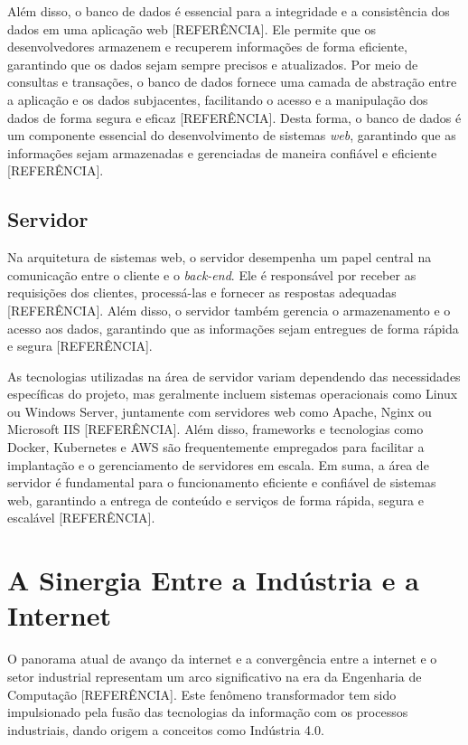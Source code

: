 Além disso, o banco de dados é essencial para a integridade e a consistência dos dados em uma aplicação web [REFERÊNCIA]. Ele permite que os desenvolvedores armazenem e recuperem informações de forma eficiente, garantindo que os dados sejam sempre precisos e atualizados. Por meio de consultas e transações, o banco de dados fornece uma camada de abstração entre a aplicação e os dados subjacentes, facilitando o acesso e a manipulação dos dados de forma segura e eficaz [REFERÊNCIA]. Desta forma, o banco de dados é um componente essencial do desenvolvimento de sistemas \textit{web}, garantindo que as informações sejam armazenadas e gerenciadas de maneira confiável e eficiente [REFERÊNCIA].

\subsection{Servidor}

Na arquitetura de sistemas web, o servidor desempenha um papel central na comunicação entre o cliente e o \textit{back-end}. Ele é responsável por receber as requisições dos clientes, processá-las e fornecer as respostas adequadas [REFERÊNCIA]. Além disso, o servidor também gerencia o armazenamento e o acesso aos dados, garantindo que as informações sejam entregues de forma rápida e segura [REFERÊNCIA].

As tecnologias utilizadas na área de servidor variam dependendo das necessidades específicas do projeto, mas geralmente incluem sistemas operacionais como Linux ou Windows Server, juntamente com servidores web como Apache, Nginx ou Microsoft IIS [REFERÊNCIA]. Além disso, frameworks e tecnologias como Docker, Kubernetes e AWS são frequentemente empregados para facilitar a implantação e o gerenciamento de servidores em escala. Em suma, a área de servidor é fundamental para o funcionamento eficiente e confiável de sistemas web, garantindo a entrega de conteúdo e serviços de forma rápida, segura e escalável [REFERÊNCIA].

\section{A Sinergia Entre a Indústria e a Internet}

O panorama atual de avanço da internet e a convergência entre a internet e o setor industrial representam um arco significativo na era da Engenharia de Computação [REFERÊNCIA]. Este fenômeno transformador tem sido impulsionado pela fusão das tecnologias da informação com os processos industriais, dando origem a conceitos como Indústria 4.0. 

